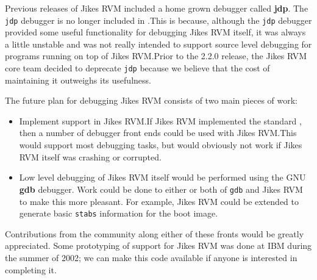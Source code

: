 Previous releases of Jikes\TMweb{} RVM included a home grown
debugger called {\bf jdp}.  The \texttt{jdp} debugger is no longer included in
\jrvm{}.\@  This is because, although the \texttt{jdp} debugger provided some
useful functionality for debugging Jikes RVM itself, it was always a
little unstable and was not really intended to support source level
debugging for programs running on top of Jikes RVM.\@  Prior to the
2.2.0 release, the Jikes RVM core team decided to deprecate \texttt{jdp}
because we believe that the cost of maintaining it outweighs its
usefulness.


The future plan for debugging Jikes RVM consists of two main pieces of
work:

\label{JDWP}
\begin{itemize}
\item Implement  support in Jikes RVM.\@ If Jikes RVM
implemented the standard , then a 
number of debugger front ends could be used with Jikes RVM.\@  This
would support most debugging tasks, but would obviously not work if
Jikes RVM itself was crashing or corrupted.

\item Low level debugging of Jikes RVM itself would be performed using
the GNU {\bf gdb} debugger.  Work could be done to either or both of
{\tt gdb} and Jikes RVM to make this more pleasant.  For example,
Jikes RVM could be extended to generate basic {\tt stabs} information
for the boot image.
\end{itemize}

Contributions from the community along either of these fronts would be
greatly appreciated.  Some prototyping of  support for Jikes RVM
was done at IBM during the summer of 2002; we can make this code
available if anyone is interested in completing it.


